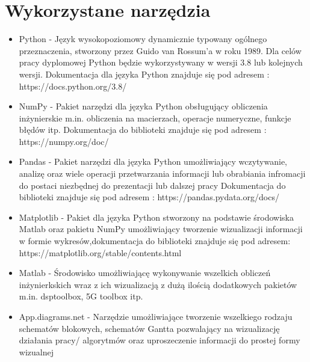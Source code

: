 \documentclass[eng, pl, oneside, openright, final, openbib]{mgr}\DeclareUnicodeCharacter{0301}{\'{e}}
\begin{document}
\section{Wykorzystane narzędzia}
\begin{itemize}
    \item Python - Język wysokopoziomowy dynamicznie typowany ogólnego przeznaczenia, stworzony przez Guido van Rossum'a w roku 1989. Dla celów pracy dyplomowej Python będzie wykorzystywany w wersji 3.8 lub kolejnych wersji. Dokumentacja dla języka Python znajduje się pod adresem  : https://docs.python.org/3.8/
    \item NumPy - Pakiet narzędzi dla języka Python obsługujący obliczenia inżynierskie m.in. obliczenia na macierzach, operacje numeryczne, funkcje błędów itp. Dokumentacja do biblioteki znajduje się pod adresem : https://numpy.org/doc/
    \item Pandas - Pakiet narzędzi dla języka Python umożliwiający wczytywanie,  analizę oraz wiele operacji przetwarzania informacji lub obrabiania infromacji do postaci niezbędnej do prezentacji lub dalszej pracy Dokumentacja do biblioteki znajduje się pod adresem : https://pandas.pydata.org/docs/
    \item Matplotlib - Pakiet dla języka Python stworzony na podstawie środowiska Matlab oraz pakietu NumPy umożliwiający tworzenie wizualizacji informacji w formie wykresów,\newline dokumentacja do biblioteki znajduje się pod adresem: \newline https://matplotlib.org/stable/contents.html 
    \item Matlab - Środowisko umożliwiającę wykonywanie wszelkich obliczeń inżynierkskich wraz z ich wizualizacją z dużą ilością dodatkowych pakietów m.in. dsptoolbox, 5G toolbox itp. 
    \item App.diagrams.net - Narzędzie umożliwiające tworzenie wszelkiego rodzaju schematów blokowych, schematów Gantta pozwalający na wizualizację działania pracy/ algorytmów oraz uproszeczenie informacji do prostej formy wizualnej 
\end{itemize}
\newpage
\end{document}
